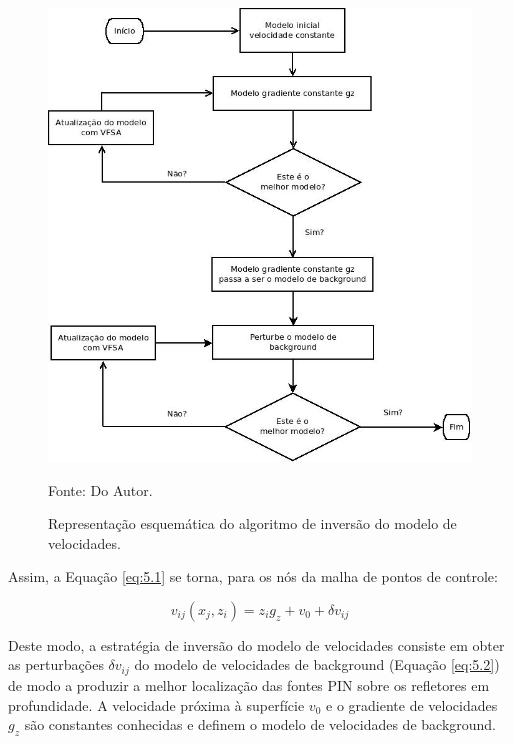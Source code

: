 \begin{figure}[H]
\caption{Representação esquemática do algoritmo de inversão do modelo de velocidades.}
\begin{center}
\includegraphics[scale=0.5]{images/fluxonovoVel.jpeg}
\vspace{-0.3cm}
\end{center}
\begin{center}
 Fonte: Do Autor.
\end{center}
\label{fig:5.1}
\end{figure}

Assim, a Equação \ref{eq:5.1} se torna, para os nós da malha de pontos de controle:

\begin{equation}
\label{eq:5.2}
v_{ij}(x_j,z_i)=z_i g_z+v_0+\delta v_{ij}
\end{equation}

Deste modo, a estratégia de inversão do modelo de velocidades consiste em obter
as perturbações $\delta v_{ij}$ do modelo de velocidades de background (Equação \ref{eq:5.2})
de modo a produzir a melhor localização das fontes PIN sobre os refletores em profundidade.
A velocidade próxima à superfície $v_0$ e o gradiente de velocidades $g_z$ são constantes conhecidas
e definem o modelo de velocidades de background.


